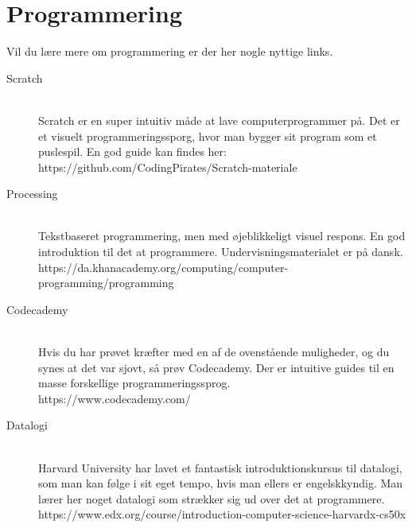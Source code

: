 \documentclass[11pt]{article}
\begin{document}
\section{Programmering}
Vil du lære mere om programmering er der her nogle nyttige links.
\begin{description}
    \item[Scratch]~\\
        Scratch er en super intuitiv måde at lave computerprogrammer på. Det er et visuelt programmeringssporg, hvor man bygger sit program som et puslespil. En god guide kan findes her: https://github.com/CodingPirates/Scratch-materiale
    \item[Processing]~\\
        Tekstbaseret programmering, men med øjeblikkeligt visuel respons. En god introduktion til det at programmere. Undervisningsmaterialet er på dansk. \\
        https://da.khanacademy.org/computing/computer-programming/programming
    \item[Codecademy]~\\
        Hvis du har prøvet kræfter med en af de ovenstående muligheder, og du synes at det var sjovt, så prøv Codecademy. Der er intuitive guides til en masse forskellige programmeringssprog. \\ https://www.codecademy.com/
    \item[Datalogi]~\\
        Harvard University har lavet et fantastisk introduktionskursus til datalogi, som man kan følge i sit eget tempo, hvis man ellers er engelskkyndig. Man lærer her noget datalogi som strækker sig ud over det at programmere. \\
        https://www.edx.org/course/introduction-computer-science-harvardx-cs50x

\end{description}
\end{document}
